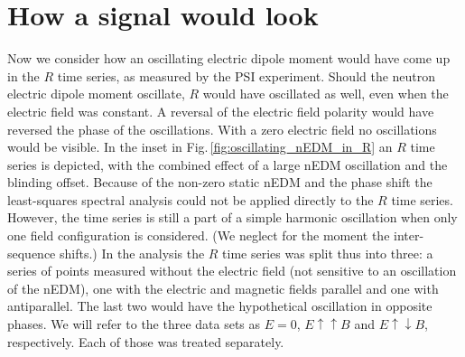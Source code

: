







\section{How a signal would look}
Now we consider how an oscillating electric dipole moment would have come up in the $R$ time series, as measured by the PSI experiment.
Should the neutron electric dipole moment oscillate, $R$ would have oscillated as well, even when the electric field was constant. A reversal of the electric field polarity would have reversed the phase of the oscillations. With a zero electric field no oscillations would be visible. In the inset in Fig.\,\ref{fig:oscillating_nEDM_in_R} an $R$ time series is depicted, with the combined effect of a large nEDM oscillation and the blinding offset.
Because of the non-zero static nEDM and the phase shift the least-squares spectral analysis could not be applied directly to the $R$ time series. However, the time series is still a part of a simple harmonic oscillation when only one field configuration is considered. (We neglect for the moment the inter-sequence shifts.) In the analysis the $R$ time series was split thus into three: a series of points measured without the electric field (not sensitive to an oscillation of the nEDM), one with the electric and magnetic fields parallel and one with antiparallel. The last two would have the hypothetical oscillation in opposite phases. We will refer to the three data sets as $E=0$, $E \uparrow \uparrow B$ and $E \uparrow \downarrow B$, respectively. Each of those was treated separately.

